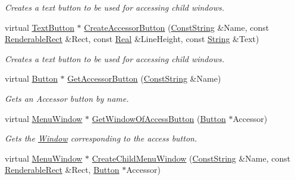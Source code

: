 \begin{DoxyCompactItemize}
\begin{DoxyCompactList}\small\item\em Creates a text button to be used for accessing child windows. \item\end{DoxyCompactList}\item 
virtual \hyperlink{classphys_1_1UI_1_1TextButton}{TextButton} $\ast$ \hyperlink{classphys_1_1UI_1_1MenuWindow_ac9dd762c93f68e5cac2b0b27dae8a448}{CreateAccessorButton} (\hyperlink{namespacephys_a5ce5049f8b4bf88d6413c47b504ebb31}{ConstString} \&Name, const \hyperlink{structphys_1_1UI_1_1RenderableRect}{RenderableRect} \&Rect, const \hyperlink{namespacephys_af7eb897198d265b8e868f45240230d5f}{Real} \&LineHeight, const \hyperlink{namespacephys_aa03900411993de7fbfec4789bc1d392e}{String} \&Text)
\begin{DoxyCompactList}\small\item\em Creates a text button to be used for accessing child windows. \item\end{DoxyCompactList}\item 
virtual \hyperlink{classphys_1_1UI_1_1Button}{Button} $\ast$ \hyperlink{classphys_1_1UI_1_1MenuWindow_a7ee13fd6573f8c6d4f6c4992d414e7c2}{GetAccessorButton} (\hyperlink{namespacephys_a5ce5049f8b4bf88d6413c47b504ebb31}{ConstString} \&Name)
\begin{DoxyCompactList}\small\item\em Gets an Accessor button by name. \item\end{DoxyCompactList}\item 
virtual \hyperlink{classphys_1_1UI_1_1MenuWindow}{MenuWindow} $\ast$ \hyperlink{classphys_1_1UI_1_1MenuWindow_a12b1586cd33bc03b5902018376878961}{GetWindowOfAccessButton} (\hyperlink{classphys_1_1UI_1_1Button}{Button} $\ast$Accessor)
\begin{DoxyCompactList}\small\item\em Gets the \hyperlink{classphys_1_1UI_1_1Window}{Window} corresponding to the access button. \item\end{DoxyCompactList}\item 
virtual \hyperlink{classphys_1_1UI_1_1MenuWindow}{MenuWindow} $\ast$ \hyperlink{classphys_1_1UI_1_1MenuWindow_a2a799315e974c7f58e1e186abd6504e0}{CreateChildMenuWindow} (\hyperlink{namespacephys_a5ce5049f8b4bf88d6413c47b504ebb31}{ConstString} \&Name, const \hyperlink{structphys_1_1UI_1_1RenderableRect}{RenderableRect} \&Rect, \hyperlink{classphys_1_1UI_1_1Button}{Button} $\ast$Accessor)

\end{DoxyCompactItemize}
